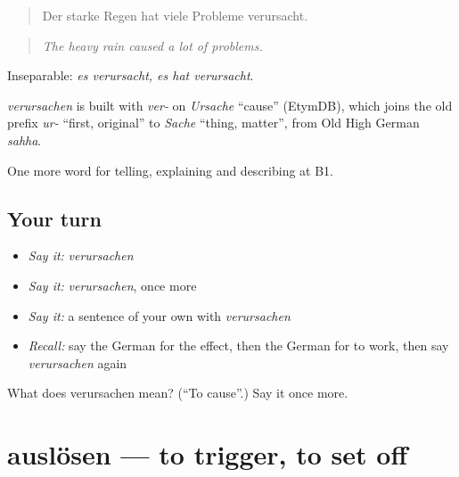 \begin{quote}
Der starke Regen hat viele Probleme verursacht.
\end{quote}

\begin{quote}
\emph{The heavy rain caused a lot of problems.}
\end{quote}

Inseparable: \emph{es verursacht, es hat verursacht}.

\begin{cousinweb}
\emph{verursachen} is built with \emph{ver-} on \emph{Ursache} \textquotedblleft{}cause\textquotedblright{} (EtymDB), which joins the old prefix \emph{ur-} \textquotedblleft{}first, original\textquotedblright{} to \emph{Sache} \textquotedblleft{}thing, matter\textquotedblright{}, from Old High German \emph{sahha}.
\end{cousinweb}

\begin{grammarlens}[title={What you've built}]
One more word for telling, explaining and describing at B1.
\end{grammarlens}

\subsection*{Your turn}
\begin{itemize}
\raggedright
  \item \emph{Say it:} \emph{verursachen}
  \item \emph{Say it:} \emph{verursachen}, once more
  \item \emph{Say it:} a sentence of your own with \emph{verursachen}
  \item \emph{Recall:} say the German for the effect, then the German for to work, then say \emph{verursachen} again
\end{itemize}

\begin{tcolorbox}[breakable,colback=teal!4,colframe=teal!35!black,title={Before you move on}]
What does verursachen mean? (\textquotedblleft{}To cause\textquotedblright{}.) Say it once more.
\end{tcolorbox}
\section[auslösen]{auslösen — to trigger, to set off}

\label{lesson:GE-C342-ausloesen}



